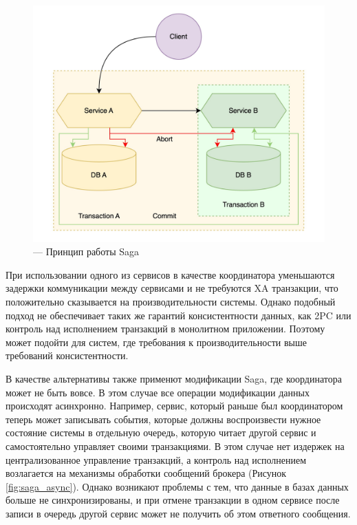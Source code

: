 \begin{figure}[H]
    \centering
    \includegraphics[width=0.8\linewidth]{img/saga.png}
    \caption{--- Принцип работы Saga}
    \label{fig:saga}
\end{figure}

При использовании одного из сервисов в качестве координатора уменьшаются задержки
коммуникации между сервисами и не требуются XA транзакции, что положительно сказывается на производительности
системы. Однако подобный подход не обеспечивает таких же гарантий консистентности данных, как 2PC или контроль над исполнением
транзакций в монолитном приложении. Поэтому может подойти для систем, где требования к производительности выше требований консистентности.

В качестве альтернативы также применют модификации Saga, где координатора может не быть вовсе. В этом
случае все операции модификации данных происходят асинхронно. Например, сервис, который раньше был координатором теперь может записывать
события, которые должны воспроизвести нужное состояние системы в отдельную очередь, которую читает другой сервис и самостоятельно управляет своими транзакциями.
В этом случае нет издержек на централизованное управление транзакций, а контроль над исполнением возлагается на механизмы обработки сообщений брокера (Рисунок \ref{fig:saga_async}).
Однако возникают проблемы с тем, что данные в базах данных больше не синхронизированы, 
и при отмене транзакции в одном сервисе после записи в очередь другой сервис может не получить об этом ответного сообщения.

